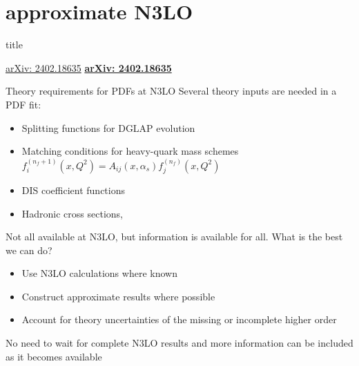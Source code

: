 \documentclass[8pt,t]{beamer}
\newcommand{\SectionTitleFrame}[1][]{%
  \begin{frame}
    \vfill
    \centering
    \begin{beamercolorbox}[sep=8pt,center,shadow=true,rounded=true]{title}
      \usebeamerfont{title}\insertsection\par
    \end{beamercolorbox}
    \ifx\relax#1\relax\else
      \vspace{0.5cm}
      \textbf{#1}
    \fi
    \vfill
  \end{frame}
}
\begin{document}
\section*{approximate N3LO}
\SectionTitleFrame[\hyperlink{https://arxiv.org/abs/2402.18635}{arXiv: 2402.18635}]


\begin{frame}{Theory requirements for PDFs at N3LO}
  Several theory inputs are needed in a PDF fit:
  \begin{itemize}
    \item Splitting functions for DGLAP evolution \\

    \item Matching conditions for heavy-quark mass schemes \\
    $ f_i^{\left(n_f+1\right)}\left(x, Q^2\right)=A_{i j}\left(x, \alpha_s\right) f_j^{\left(n_f\right)}\left(x, Q^2\right) $
    \item DIS coefficient functions
    \item Hadronic cross sections,
  \end{itemize}

  \vspace*{1em}
  Not all available at N3LO, but information is available for all. What is the best we can do?
  \begin{itemize}
    \item Use N3LO calculations where known
    \item Construct approximate results where possible
    \item Account for theory uncertainties of the missing or incomplete higher order
  \end{itemize}

  \vspace*{0.5em}
  No need to wait for complete N3LO results and more information can be included as it becomes available
\end{frame}
\end{document}
